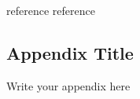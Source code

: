 \documentclass[12pt, a4paper, oneside]{report}
\renewcommand\thesection{\arabic {section}}
\begin{document}
% 




% 



\newpage

\begin{thebibliography}{99}
    reference
    reference 
\end{thebibliography}

\newpage

\begin{appendices}
    \renewcommand{\thesection}{\Alph{section}}
    \section{Appendix Title}
        Write your appendix here
\end{appendices}
\end{document}
